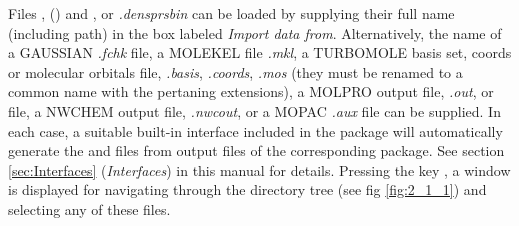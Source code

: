 \documentclass[10pt]{article}
\begin{document}
Files \ggbs{ }, (\sgbs) and \den{}, {\dengz{} or {\it .densprsbin}} can be loaded by 
supplying their full name (including path) in
the box labeled {\it Import data from}. Alternatively, the name of 
a GAUSSIAN\footnotemark{} {\it .fchk} file, a
MOLEKEL
file {\it .mkl}, a TURBOMOLE basis set, coords or molecular orbitals 
file, {\it .basis}, {\it .coords}, {\it .mos} (they must be renamed to a common name with 
the pertaning extensions), a MOLPRO output file, {\it .out}, or 
\xml{ } file, a NWCHEM output file, {\it .nwcout}, or a MOPAC
{\it .aux} file
can be supplied. In each case, a suitable built-in
interface
included in the package will automatically generate the \ggbs{ } and \den{ }
files from output files of the corresponding package. 
See section \ref{sec:Interfaces} ({\it Interfaces}) in this manual for details.
Pressing the key \teclapuntos, 
a window is displayed for navigating through the directory tree (see fig
\ref{fig:2_1_1}) and selecting any of these files.

\vspace*{5mm}
\end{document}
